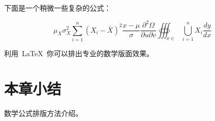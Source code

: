 下面是一个稍微一些复杂的公式：

\begin{equation}
  {\mu _X}\sigma _X^2\sum\limits_{i = 1}^n {{{({X_i} - \bar X)}^2}} \frac{{x - \mu }}{\sigma }\frac{{{\partial ^2}\Omega }}{{\partial u\partial v}}\oiiint\nolimits_{x \in }
  {\bigcup\limits_{i = 1}^n {{X_i}} \frac{{dy}}{{dx}}}
\end{equation}

利用~\LaTeX~你可以排出专业的数学版面效果。


\section{本章小结}
数学公式排版方法介绍。
